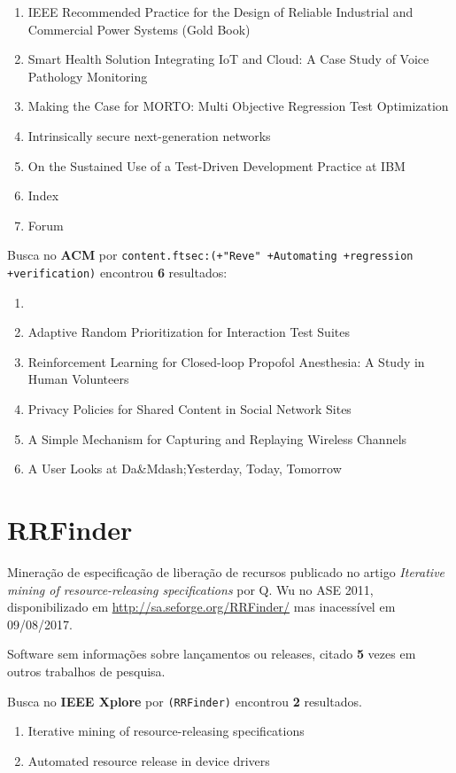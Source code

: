 \begin{enumerate}
\item IEEE Recommended Practice for the Design of Reliable Industrial and Commercial Power Systems (Gold Book)
\item Smart Health Solution Integrating IoT and Cloud: A Case Study of Voice Pathology Monitoring
\item Making the Case for MORTO: Multi Objective Regression Test Optimization
\item Intrinsically secure next-generation networks
\item On the Sustained Use of a Test-Driven Development Practice at IBM
\item Index
\item Forum
\end{enumerate}

Busca no {\bf ACM} por
\texttt{content.ftsec:(+"Reve" +Automating +regression +verification)}
encontrou {\bf 6}
resultados:

\begin{enumerate}
\item 
\item Adaptive Random Prioritization for Interaction Test Suites
\item Reinforcement Learning for Closed-loop Propofol Anesthesia: A Study in Human Volunteers
\item Privacy Policies for Shared Content in Social Network Sites
\item A Simple Mechanism for Capturing and Replaying Wireless Channels
\item A User Looks at Da\&Mdash;Yesterday, Today, Tomorrow
\end{enumerate}

\section{RRFinder}

Mineração de especificação de liberação de recursos
publicado no artigo {\it Iterative mining of resource-releasing specifications}
por Q. Wu
no ASE 2011,
disponibilizado em \url{http://sa.seforge.org/RRFinder/}
mas inacessível em 09/08/2017.

Software sem informações sobre lançamentos ou releases,
citado {\bf 5} vezes em outros trabalhos de pesquisa.

Busca no {\bf IEEE Xplore} por
\texttt{(RRFinder)}
encontrou {\bf 2}
resultados.

\begin{enumerate}
\item Iterative mining of resource-releasing specifications
\item Automated resource release in device drivers
\end{enumerate}

